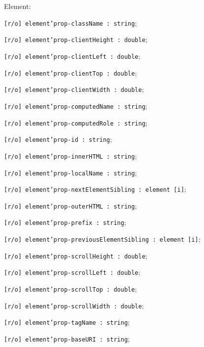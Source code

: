 \begin{icItems}
	\item Element:
	\begin{icItems}
		\item \texttt{[r/o] element'prop-className : string};
		\item \texttt{[r/o] element'prop-clientHeight : double};
		\item \texttt{[r/o] element'prop-clientLeft : double};
		\item \texttt{[r/o] element'prop-clientTop : double};
		\item \texttt{[r/o] element'prop-clientWidth : double};
		\item \texttt{[r/o] element'prop-computedName : string};
		\item \texttt{[r/o] element'prop-computedRole : string};
		\item \texttt{[r/o] element'prop-id : string};
		\item \texttt{[r/o] element'prop-innerHTML : string};
		\item \texttt{[r/o] element'prop-localName : string};
		\item \texttt{[r/o] element'prop-nextElementSibling : element [i]};
		\item \texttt{[r/o] element'prop-outerHTML : string};
		\item \texttt{[r/o] element'prop-prefix : string};
		\item \texttt{[r/o] element'prop-previousElementSibling : element [i]};
		\item \texttt{[r/o] element'prop-scrollHeight : double};
		\item \texttt{[r/o] element'prop-scrollLeft : double};
		\item \texttt{[r/o] element'prop-scrollTop : double};
		\item \texttt{[r/o] element'prop-scrollWidth : double};
		\item \texttt{[r/o] element'prop-tagName : string};
		\item \texttt{[r/o] element'prop-baseURI : string};
	\end{icItems}
	

\end{icItems}
